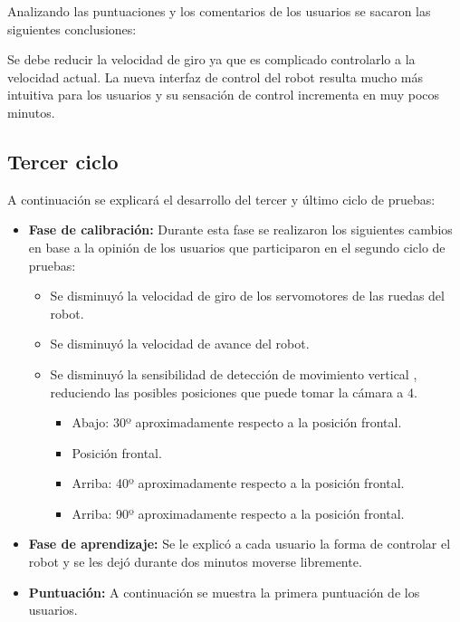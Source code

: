 \documentclass[twoside, 12pt]{epstfg}
\begin{document}
Analizando las puntuaciones y los comentarios de los usuarios se sacaron las siguientes conclusiones:

Se debe reducir la velocidad de giro ya que es complicado controlarlo a la velocidad actual.
La nueva interfaz de control del robot resulta mucho más intuitiva para los usuarios y su sensación de control incrementa en muy pocos minutos.

\subsection{Tercer ciclo}

A continuación se explicará el desarrollo del tercer y último ciclo de pruebas:
\begin{itemize}
	\item \textbf{Fase de calibración:} Durante esta fase se realizaron los siguientes cambios en base a la opinión de los usuarios que participaron en el segundo ciclo de pruebas:
	\begin{itemize}
		\item Se disminuyó la velocidad de giro de los servomotores de las ruedas del robot.
		\item Se disminuyó la velocidad de avance del robot.
		\item Se disminuyó la sensibilidad de detección de movimiento vertical , reduciendo las posibles posiciones que puede tomar la cámara a 4.
		\begin{itemize}
			\item Abajo: 30º aproximadamente respecto a la posición frontal.
			\item Posición frontal.
			\item Arriba: 40º aproximadamente respecto a la posición frontal.
			\item Arriba: 90º aproximadamente respecto a la posición frontal.
		\end{itemize}
	\end{itemize}
	\item \textbf{Fase de aprendizaje:} Se le explicó a cada usuario la forma de controlar el robot y se les dejó durante dos minutos moverse libremente.
	\item \textbf{Puntuación: } A continuación se muestra la primera puntuación de los usuarios.
	
\begin{center}


\end{center}
\end{itemize}
\end{document}
